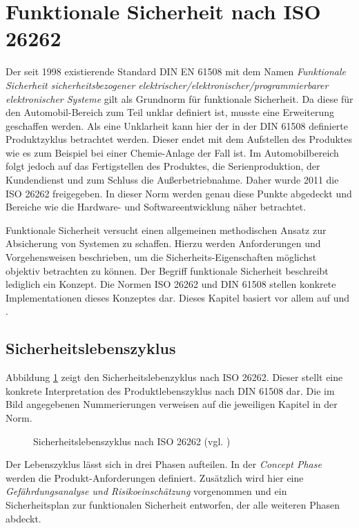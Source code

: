 \documentclass[
  a4paper,					    %
  twoside,
  DIV=calc,     				%
  bibliography=totoc,
  cleardoublepage=empty,
  ngerman,     					%
  final       					%
]{scrbook}
\begin{document}
\section{Funktionale Sicherheit nach ISO 26262}
\label{sec:Sicherheit}
Der seit 1998 existierende Standard DIN EN 61508 mit dem Namen \emph{Funktionale Sicherheit sicherheitsbezogener elektrischer/elektronischer/programmierbarer elektronischer Systeme} gilt als Grundnorm für funktionale Sicherheit. Da diese für den Automobil-Bereich zum Teil unklar definiert ist, musste eine Erweiterung geschaffen werden. Als eine Unklarheit kann hier der in der DIN 61508 definierte Produktzyklus betrachtet werden. Dieser endet mit dem Aufstellen des Produktes wie es zum Beispiel bei einer Chemie-Anlage der Fall ist. Im Automobilbereich folgt jedoch auf das Fertigstellen des Produktes, die Serienproduktion, der Kundendienst und zum Schluss die Außerbetriebnahme. Daher wurde 2011 die ISO 26262 freigegeben. In dieser Norm werden genau diese Punkte abgedeckt und Bereiche wie die Hardware- und Softwareentwicklung näher betrachtet.

Funktionale Sicherheit versucht einen allgemeinen methodischen Ansatz zur Absicherung von Systemen zu schaffen. Hierzu werden Anforderungen und Vorgehensweisen beschrieben, um die Sicherheits-Eigenschaften möglichst objektiv betrachten zu können. Der Begriff funktionale Sicherheit beschreibt lediglich ein Konzept. Die Normen ISO 26262 und DIN 61508 stellen konkrete Implementationen dieses Konzeptes dar. Dieses Kapitel basiert vor allem auf \cite{iso26262} und \cite{iso26262_robuste}.

\subsection{Sicherheitslebenszyklus}
\label{sec:ISO26262_lebenszyklus}

Abbildung \ref{fig:lifecycle} zeigt den Sicherheitslebenzyklus nach ISO 26262. Dieser stellt eine konkrete Interpretation des Produktlebenszyklus nach DIN 61508 dar. Die im Bild angegebenen Nummerierungen verweisen auf die jeweiligen Kapitel in der Norm. 

\begin{figure}[p]
    \center
    
    \caption[Sicherheitslebenszyklus nach ISO 26262]{Sicherheitslebenszyklus nach ISO 26262 (vgl. \cite{iso26262})}
    \label{fig:lifecycle}
\end{figure}

Der Lebenszyklus lässt sich in drei Phasen aufteilen. In der \emph{Concept Phase} werden die Produkt-Anforderungen definiert. Zusätzlich wird hier eine \emph{Gefährdungsanalyse und Risikoeinschätzung} vorgenommen und ein Sicherheitsplan zur funktionalen Sicherheit entworfen, der alle weiteren Phasen abdeckt.
\end{document}

